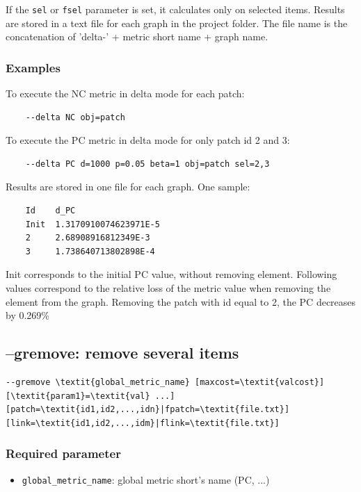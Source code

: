 \documentclass[a4paper,10pt]{report}
\begin{document}
If the \verb|sel| or \verb|fsel| parameter is set, it calculates only on selected items.
Results are stored in a text file for each graph in the project folder. The file name is the concatenation of 'delta-' + metric short name + graph name. 


\subsubsection{Examples}
To execute the NC metric in delta mode for each patch:
\begin{Verbatim}
	--delta NC obj=patch
\end{Verbatim}

To execute the PC metric in delta mode for only patch id 2 and 3:
\begin{Verbatim}
	--delta PC d=1000 p=0.05 beta=1 obj=patch sel=2,3
\end{Verbatim}
Results are stored in one file for each graph. One sample:
\begin{Verbatim}
	Id    d_PC
	Init  1.3170910074623971E-5
	2     2.68908916812349E-3
	3     1.738640713802898E-4
\end{Verbatim}
Init corresponds to the initial PC value, without removing element. Following values correspond to the relative loss of the metric value when removing the element from the graph.
Removing the patch with id equal to 2, the PC decreases by 0.269\%


\subsection{--gremove: remove several items}
\begin{Verbatim}[commandchars=\\\{\}]
--gremove \textit{global_metric_name} [maxcost=\textit{valcost}] [\textit{param1}=\textit{val} ...]
[patch=\textit{id1,id2,...,idn}|fpatch=\textit{file.txt}] [link=\textit{id1,id2,...,idm}|flink=\textit{file.txt}]
\end{Verbatim}

\subsubsection{Required parameter}
\begin{itemize}
	\item \verb|global_metric_name|: global metric short's name (PC, ...)
\end{itemize}
\end{document}
